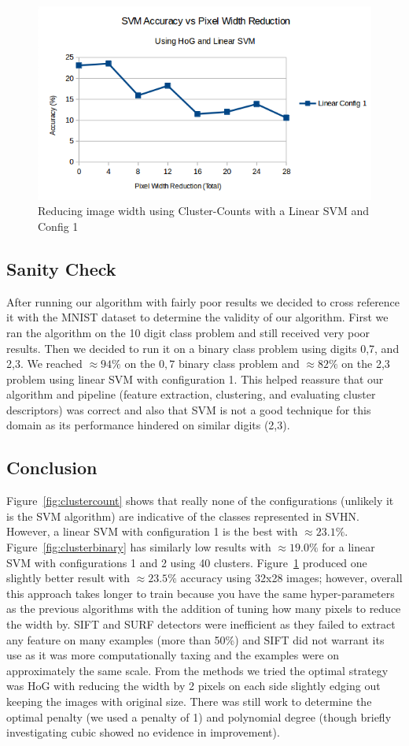 \documentclass{article} %
\begin{document}
\begin{figure}
\centering
	\includegraphics[width=0.8\linewidth]{./plots/svm/trim}
    	\caption{Reducing image width using Cluster-Counts with a Linear SVM and Config 1}
	\label{fig:svtrim}
\end{figure}

\subsection{Sanity Check}
After running our algorithm with fairly poor results we decided to cross reference it with the MNIST dataset to determine the validity of our algorithm. First we ran the algorithm on the 10 digit class problem and still received very poor results. Then we decided to run it on a binary class problem using digits 0,7, and 2,3. We reached $\approx 94\%$ on the $0,7$ binary class problem and $\approx 82\%$ on the 2,3 problem using linear SVM with configuration 1. This helped reassure that our algorithm and pipeline (feature extraction, clustering, and evaluating cluster descriptors) was correct and also that SVM is not a good technique for this domain as its performance hindered on similar digits (2,3).

\subsection{Conclusion}
Figure~\ref{fig:clustercount} shows that really none of the configurations (unlikely it is the SVM algorithm) are indicative of the classes represented in SVHN.  However, a linear SVM with configuration 1 is the best with $\approx 23.1\%$.  Figure~\ref{fig:clusterbinary} has similarly low results with $\approx 19.0\%$ for a linear SVM with configurations 1 and 2 using 40 clusters.  Figure~\ref{fig:svtrim} produced one slightly better result with $\approx 23.5\%$ accuracy using 32x28 images; however, overall this approach takes longer to train because you have the same hyper-parameters as the previous algorithms with the addition of tuning how many pixels to reduce the width by.  SIFT and SURF detectors were inefficient as they failed to extract any feature on many examples (more than 50\%) and SIFT did not warrant its use as it was more computationally taxing and the examples were on approximately the same scale.  From the methods we tried the optimal strategy was HoG with reducing the width by 2 pixels on each side slightly edging out keeping the images with original size. There was still work to determine the optimal penalty (we used a penalty of 1) and polynomial degree (though briefly investigating cubic showed no evidence in improvement).
\end{document}
